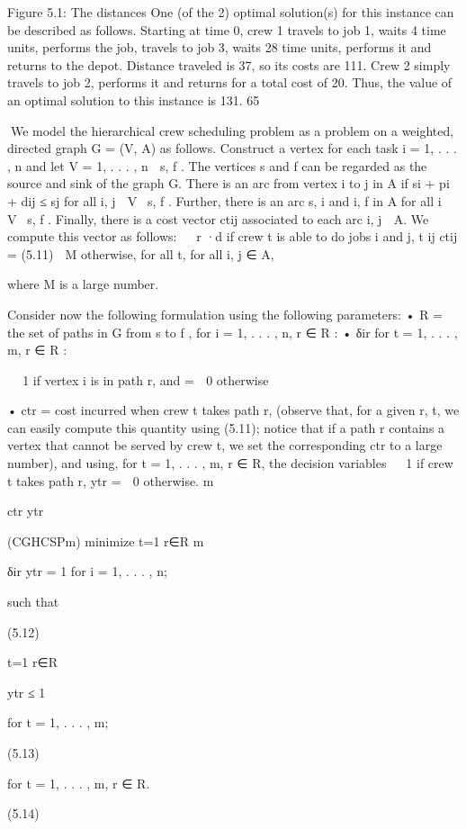 Figure 5.1: The distances
One (of the 2) optimal solution(s) for this instance can be described as follows. Starting at time 0, crew
1 travels to job 1, waits 4 time units, performs the job, travels to job 3, waits 28 time units, performs it
and returns to the depot. Distance traveled is 37, so its costs are 111. Crew 2 simply travels to job 2,
performs it and returns for a total cost of 20. Thus, the value of an optimal solution to this instance is
131.
65

We model the hierarchical crew scheduling problem as a problem on a weighted, directed graph G = (V, A)
as follows. Construct a vertex for each task i = 1, . . . , n and let V = {1, . . . , n} ∪ {s, f }. The vertices s
and f can be regarded as the source and sink of the graph G. There is an arc from vertex i to j in A if
si + pi + dij ≤ sj for all i, j ∈ V \ {s, f }. Further, there is an arc {s, i} and {i, f } in A for all i ∈ V \ {s, f }.
Finally, there is a cost vector ctij associated to each arc {i, j} ∈ A. We compute this vector as follows:

 r ·d
if crew t is able to do jobs i and j,
t
ij
ctij =
(5.11)
 M
otherwise, for all t, for all {i, j} ∈ A,

where M is a large number.

Consider now the following formulation using the following parameters:
• R = the set of paths in G from s to f ,
for i = 1, . . . , n, r ∈ R :
• δir
for t = 1, . . . , m, r ∈ R :


 1 if vertex i is in path r, and
=
 0 otherwise

• ctr = cost incurred when crew t takes path r, (observe that, for a given r, t, we can easily compute
this quantity using (5.11); notice that if a path r contains a vertex that cannot be served by crew t, we
set the corresponding ctr to a large number),
and using, for t = 1, . . . , m, r ∈ R, the decision variables

 1 if crew t takes path r,
ytr =
 0 otherwise.
m

ctr ytr

(CGHCSPm) minimize
t=1 r∈R
m

δir ytr = 1 for i = 1, . . . , n;

such that

(5.12)

t=1 r∈R

ytr ≤ 1

for t = 1, . . . , m;

(5.13)

for t = 1, . . . , m, r ∈ R.

(5.14)

